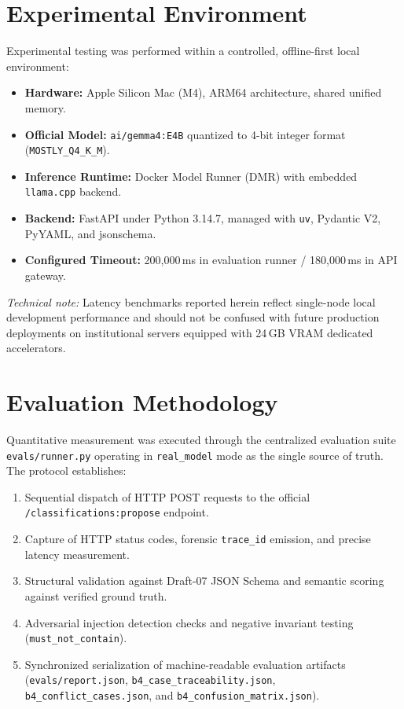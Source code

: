 \documentclass[11pt,a4paper]{article}
\begin{document}
\section{Experimental Environment}
Experimental testing was performed within a controlled, offline-first local environment:
\begin{itemize}[leftmargin=*]
    \item \textbf{Hardware:} Apple Silicon Mac (M4), ARM64 architecture, shared unified memory.
    \item \textbf{Official Model:} \texttt{ai/gemma4:E4B} quantized to 4-bit integer format (\texttt{MOSTLY\_Q4\_K\_M}).
    \item \textbf{Inference Runtime:} Docker Model Runner (DMR) with embedded \texttt{llama.cpp} backend.
    \item \textbf{Backend:} FastAPI under Python 3.14.7, managed with \texttt{uv}, Pydantic V2, PyYAML, and jsonschema.
    \item \textbf{Configured Timeout:} 200,000\,ms in evaluation runner / 180,000\,ms in API gateway.
\end{itemize}

\textit{Technical note:} Latency benchmarks reported herein reflect single-node local development performance and should not be confused with future production deployments on institutional servers equipped with 24\,GB VRAM dedicated accelerators.

\section{Evaluation Methodology}
Quantitative measurement was executed through the centralized evaluation suite \texttt{evals/runner.py} operating in \texttt{real\_model} mode as the single source of truth. The protocol establishes:
\begin{enumerate}
    \item Sequential dispatch of HTTP POST requests to the official \texttt{/classifications:propose} endpoint.
    \item Capture of HTTP status codes, forensic \texttt{trace\_id} emission, and precise latency measurement.
    \item Structural validation against Draft-07 JSON Schema and semantic scoring against verified ground truth.
    \item Adversarial injection detection checks and negative invariant testing (\texttt{must\_not\_contain}).
    \item Synchronized serialization of machine-readable evaluation artifacts (\texttt{evals/report.json}, \texttt{b4\_case\_traceability.json}, \texttt{b4\_conflict\_cases.json}, and \texttt{b4\_confusion\_matrix.json}).
\end{enumerate}
\end{document}
